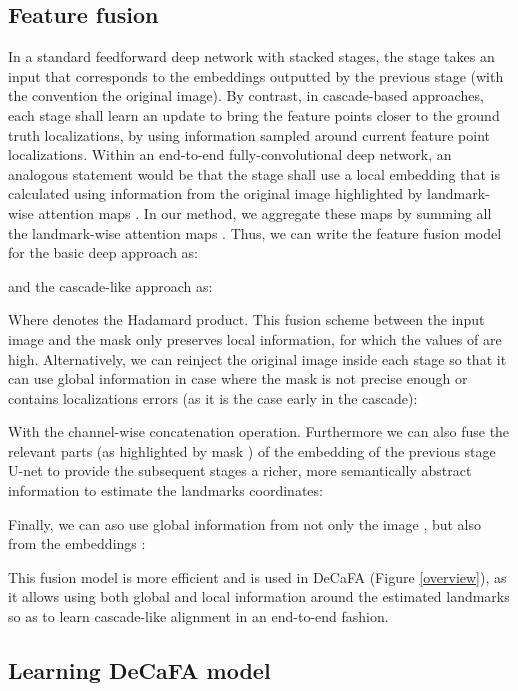 \documentclass[10pt,twocolumn,letterpaper]{article}
\begin{document}
\subsection{Feature fusion}\label{fuuusion}

In a standard feedforward deep network with  stacked stages, the  stage takes an input  that corresponds to the embeddings  outputted by the previous stage (with the convention  the original image). By contrast, in cascade-based approaches, each stage shall learn an update to bring the feature points closer to the ground truth localizations, by using information sampled around current feature point localizations. Within an end-to-end fully-convolutional deep network, an analogous statement would be that the  stage shall use a local embedding  that is calculated using information from the original image  highlighted by landmark-wise attention maps . In our method, we aggregate these maps by summing all the landmark-wise attention maps . Thus, we can write the feature fusion model for the basic deep approach as:



and the cascade-like approach as:



Where  denotes the Hadamard product. This fusion scheme between the input image and the mask only preserves local information, for which the values of  are high. Alternatively, we can reinject the original image  inside each stage so that it can use global information in case where the mask  is not precise enough or contains localizations errors (as it is the case early in the cascade):



With  the channel-wise concatenation operation. Furthermore we can also fuse the relevant parts (as highlighted by mask ) of the embedding  of the previous stage U-net to provide the subsequent stages a richer, more semantically abstract information to estimate the landmarks coordinates:



Finally, we can aso use global information from not only the image , but also from the embeddings :



This fusion model is more efficient and is used in DeCaFA (Figure \ref{overview}), as it allows using both global and local information around the estimated landmarks so as to learn cascade-like alignment in an end-to-end fashion.

\subsection{Learning DeCaFA model}\label{leearning}
\end{document}
